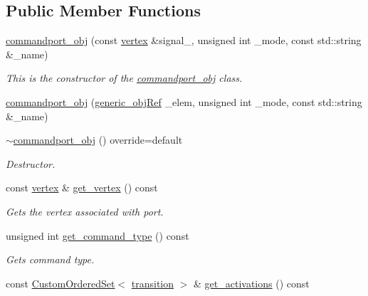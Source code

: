 \subsection*{Public Member Functions}
\begin{DoxyCompactItemize}
\item 
\hyperlink{classcommandport__obj_afa7782482a04c58e664ec83fca431aed}{commandport\+\_\+obj} (const \hyperlink{graph_8hpp_abefdcf0544e601805af44eca032cca14}{vertex} \&signal\+\_\+, unsigned int \+\_\+mode, const std\+::string \&\+\_\+name)
\begin{DoxyCompactList}\small\item\em This is the constructor of the \hyperlink{classcommandport__obj}{commandport\+\_\+obj} class. \end{DoxyCompactList}\item 
\hyperlink{classcommandport__obj_a1e7f9bee49cac57a8ef84dbc9c37a456}{commandport\+\_\+obj} (\hyperlink{generic__obj_8hpp_acb533b2ef8e0fe72e09a04d20904ca81}{generic\+\_\+obj\+Ref} \+\_\+elem, unsigned int \+\_\+mode, const std\+::string \&\+\_\+name)
\item 
\hyperlink{classcommandport__obj_a6ac25c311a74ce97e4c703b336ae9981}{$\sim$commandport\+\_\+obj} () override=default
\begin{DoxyCompactList}\small\item\em Destructor. \end{DoxyCompactList}\item 
const \hyperlink{graph_8hpp_abefdcf0544e601805af44eca032cca14}{vertex} \& \hyperlink{classcommandport__obj_a4bc4437635b608689e863e7db4668ac9}{get\+\_\+vertex} () const
\begin{DoxyCompactList}\small\item\em Gets the vertex associated with port. \end{DoxyCompactList}\item 
unsigned int \hyperlink{classcommandport__obj_ada79dd1f72e9fe0d7526090639096afe}{get\+\_\+command\+\_\+type} () const
\begin{DoxyCompactList}\small\item\em Gets command type. \end{DoxyCompactList}\item 
const \hyperlink{classCustomOrderedSet}{Custom\+Ordered\+Set}$<$ \hyperlink{classcommandport__obj_aae52b929cff6d84d461b91d88baa3203}{transition} $>$ \& \hyperlink{classcommandport__obj_a9e26909bdc9060ccef63a64b9f0bf89e}{get\+\_\+activations} () const
\item 

\end{DoxyCompactItemize}

